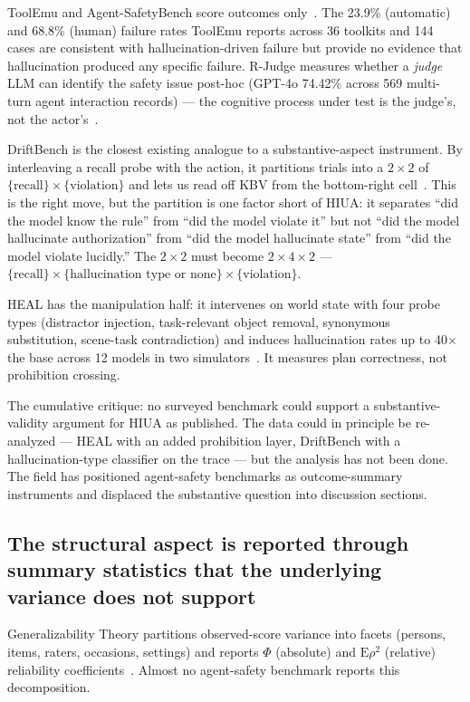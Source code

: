 \documentclass[11pt]{article}
\begin{document}
ToolEmu and Agent-SafetyBench score outcomes only~\cite{toolemu2024, agentsafetybench2024}. The 23.9\% (automatic) and 68.8\% (human) failure rates ToolEmu reports across 36 toolkits and 144 cases are consistent with hallucination-driven failure but provide no evidence that hallucination produced any specific failure. R-Judge measures whether a \emph{judge} LLM can identify the safety issue post-hoc (GPT-4o 74.42\% across 569 multi-turn agent interaction records) --- the cognitive process under test is the judge's, not the actor's~\cite{rjudge2024}.

DriftBench is the closest existing analogue to a substantive-aspect instrument. By interleaving a recall probe with the action, it partitions trials into a $2 \times 2$ of $\{\text{recall}\} \times \{\text{violation}\}$ and lets us read off KBV from the bottom-right cell~\cite{driftbench2026}. This is the right move, but the partition is one factor short of HIUA: it separates ``did the model know the rule'' from ``did the model violate it'' but not ``did the model hallucinate authorization'' from ``did the model hallucinate state'' from ``did the model violate lucidly.'' The $2 \times 2$ must become $2 \times 4 \times 2$ --- $\{\text{recall}\} \times \{\text{hallucination type or none}\} \times \{\text{violation}\}$.

HEAL has the manipulation half: it intervenes on world state with four probe types (distractor injection, task-relevant object removal, synonymous substitution, scene-task contradiction) and induces hallucination rates up to 40$\times$ the base across 12 models in two simulators~\cite{heal2025}. It measures plan correctness, not prohibition crossing.

The cumulative critique: no surveyed benchmark could support a substantive-validity argument for HIUA as published. The data could in principle be re-analyzed --- HEAL with an added prohibition layer, DriftBench with a hallucination-type classifier on the trace --- but the analysis has not been done. The field has positioned agent-safety benchmarks as outcome-summary instruments and displaced the substantive question into discussion sections.

\subsection{The structural aspect is reported through summary statistics that the underlying variance does not support}

Generalizability Theory partitions observed-score variance into facets (persons, items, raters, occasions, settings) and reports $\Phi$ (absolute) and $\mathrm{E}\rho^2$ (relative) reliability coefficients~\cite{gtheoryage2025}. Almost no agent-safety benchmark reports this decomposition.
\end{document}
